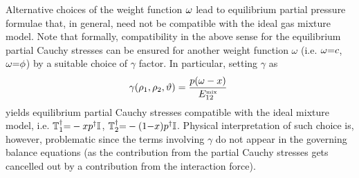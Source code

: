 \documentclass[a4paper]{article}
\begin{document}
\begin{remark}
Alternative choices of the weight function $\omega$ lead to equilibrium partial pressure formulae that, in general, need not be compatible with the ideal gas mixture model. Note that formally, compatibility in the above sense for the equilibrium partial Cauchy stresses can be ensured for another weight function $\omega$ (i.e. $\omega{=}c$, $\omega{=}\phi$) by a suitable choice of $\gamma$ factor. In particular, setting $\gamma$ as $$\gamma(\rho_1,\rho_2,\vartheta) = \frac{p(\omega-x)}{E_{12}^{\mbox{\tiny{mix}}}}\ $$ yields equilibrium partial Cauchy stresses compatible with the ideal mixture model, i.e. $\mathbb{T}^\dag_1{=}-xp^\dag\mathbb{I}$, $\mathbb{T}^\dag_2{=}-(1{-}x)p^\dag\mathbb{I}$. Physical interpretation of such choice is, however, problematic since the terms involving $\gamma$ do not appear in the governing balance equations (as the contribution from the partial Cauchy stresses gets cancelled out by a contribution from the interaction force).


\end{remark}
\end{document}
